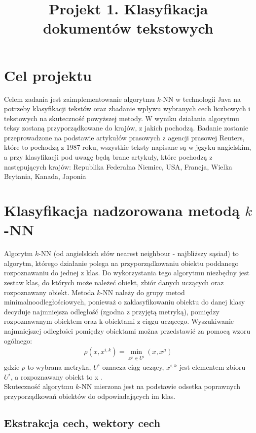 \documentclass{classrep}
\author{
  \studentinfo{Hubert Gawłowski}{224298} \and
  \studentinfo{Kamil Kiszko-Zgierski}{224328} }
\title{Projekt 1. Klasyfikacja dokumentów tekstowych}
\begin{document}
\maketitle

\section{Cel projektu}

Celem zadania jest zaimplementowanie algorytmu $k$-NN w technologii Java na potrzeby klasyfikacji tekstów
oraz zbadanie wpływu wybranych cech liczbowych i tekstowych na skuteczność powyższej metody. W wyniku działania algorytmu teksy zostaną przyporządkowane do krajów, z jakich pochodzą.
Badanie zostanie przeprowadzone na podstawie artykułów prasowych z agencji prasowej Reuters, które to pochodzą z 1987 roku, wszystkie teksty napisane są w języku angielskim, a przy klasyfikacji pod uwagę będą brane artykuły, które pochodzą z następujących krajów: Republika Federalna Niemiec, USA, Francja, Wielka Brytania, Kanada, Japonia  \\


\section{Klasyfikacja nadzorowana metodą $k$-NN}
Algorytm $k$-NN (od angielskich słów nearest neighbour - najbliższy sąsiad) to algorytm, 
którego działanie polega na przyporządkowaniu obiektu poddanego rozpoznawaniu do jednej z klas.
 Do wykorzystania tego algorytmu niezbędny jest zestaw klas, do których może należeć obiekt, zbiór danych uczących oraz rozpoznawany obiekt.
Metoda $k$-NN należy do grupy metod minimalnoodległościowych, ponieważ o zaklasyfikowaniu obiektu 
do danej klasy decyduje najmniejsza odległość (zgodna z przyjętą metryką), pomiędzy rozpoznawanym obiektem oraz k-obiektami z ciągu uczącego. 
Wyszukiwanie najmniejszej odległości pomiędzy obiektami można przedstawić za pomocą wzoru ogólnego:
\begin{gather}
\rho(x, x ^ {i, k})= \min_{x^\mu \in U^i}(x, x^\mu)
\end{gather}
\indent gdzie $\rho$ to wybrana metryka, $U^i$ oznacza ciąg uczący, $x^{i, k}$ jest elementem zbioru $U^i$, a rozpoznawany obiekt to x \cite{tadeusiewicz90}.\\
\indent Skuteczność algorytmu $k$-NN  mierzona jest na podstawie odsetka poprawnych przyporządkowań obiektów do odpowiadających im klas. 


\subsection{Ekstrakcja cech, wektory cech}
\end{document}
